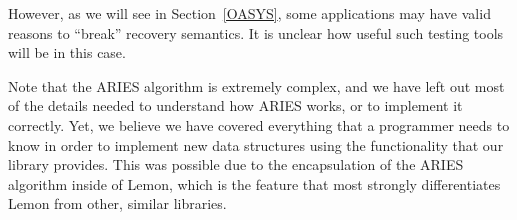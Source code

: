 \documentclass[letterpaper,twocolumn,english]{article}
\newcommand{\yad}{Lemon\xspace}
\begin{document}
However, as we will see in Section~\ref{OASYS}, some applications may
have valid reasons to ``break'' recovery semantics.  It is unclear how
useful such testing tools will be in this case.

Note that the ARIES algorithm is extremely complex, and we have left
out most of the details needed to understand how ARIES works, or to 
implement it correctly.
Yet, we believe we have covered everything that a programmer needs
 to know in order to implement new data structures using the 
functionality that our library provides. This was possible due to the encapsulation
of the ARIES algorithm inside of \yad, which is the feature that
most strongly differentiates \yad from other, similar libraries.

\end{document}
